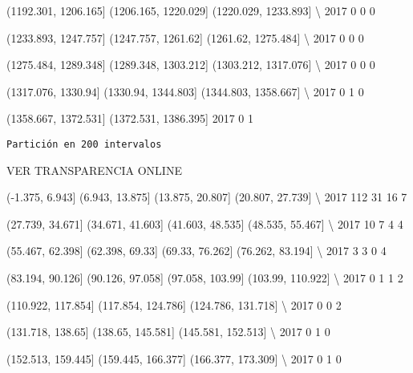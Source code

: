 \documentclass[11pt]{article}
\begin{document}
      (1192.301, 1206.165]  (1206.165, 1220.029]  (1220.029, 1233.893]  \textbackslash{}
2017                     0                     0                     0   

      (1233.893, 1247.757]  (1247.757, 1261.62]  (1261.62, 1275.484]  \textbackslash{}
2017                     0                    0                    0   

      (1275.484, 1289.348]  (1289.348, 1303.212]  (1303.212, 1317.076]  \textbackslash{}
2017                     0                     0                     0   

      (1317.076, 1330.94]  (1330.94, 1344.803]  (1344.803, 1358.667]  \textbackslash{}
2017                    0                    1                     0   

      (1358.667, 1372.531]  (1372.531, 1386.395]  
2017                     0                     1  
            
    \begin{Verbatim}[commandchars=\\\{\}]
Partición en 200 intervalos

    \end{Verbatim}

VER TRANSPARENCIA ONLINE

      (-1.375, 6.943]  (6.943, 13.875]  (13.875, 20.807]  (20.807, 27.739]  \textbackslash{}
2017              112               31                16                 7   

      (27.739, 34.671]  (34.671, 41.603]  (41.603, 48.535]  (48.535, 55.467]  \textbackslash{}
2017                10                 7                 4                 4   

      (55.467, 62.398]  (62.398, 69.33]  (69.33, 76.262]  (76.262, 83.194]  \textbackslash{}
2017                 3                3                0                 4   

      (83.194, 90.126]  (90.126, 97.058]  (97.058, 103.99]  (103.99, 110.922]  \textbackslash{}
2017                 0                 1                 1                  2   

      (110.922, 117.854]  (117.854, 124.786]  (124.786, 131.718]  \textbackslash{}
2017                   0                   0                   2   

      (131.718, 138.65]  (138.65, 145.581]  (145.581, 152.513]  \textbackslash{}
2017                  0                  1                   0   

      (152.513, 159.445]  (159.445, 166.377]  (166.377, 173.309]  \textbackslash{}
2017                   0                   1                   0   
\end{document}
